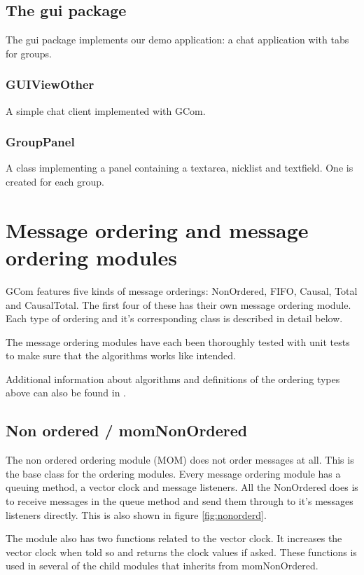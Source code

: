 \documentclass[english]{article}
\begin{document}
\subsection{The gui package}
The gui package implements our demo application: a chat application with tabs for groups. 

\subsubsection{GUIViewOther}
A simple chat client implemented with GCom.

\subsubsection{GroupPanel}
A class implementing a panel containing a textarea, nicklist and textfield. One is created for each group.


\section{Message ordering and message ordering modules}
\label{messageordering}
GCom features five kinds of message orderings: NonOrdered, FIFO, Causal, Total and CausalTotal. The first four of these has their own message ordering module. Each type of ordering and it's corresponding class is described in detail below.

The message ordering modules have each been thoroughly tested with unit tests to make sure that the algorithms works like intended.

Additional information about algorithms and definitions of the ordering types above can also be found in \cite{distsys-ordering}.

\subsection{Non ordered / momNonOrdered}
The non ordered ordering module (MOM) does not order messages at all. This is the base class for the ordering modules. Every message ordering module has a queuing method, a vector clock and message listeners. All the NonOrdered does is to receive messages in the queue method and send them through to it's messages listeners directly. This is also shown in figure \vref{fig:nonorderd}.

The module also has two functions related to the vector clock. It increases the vector clock when told so and returns the clock values if asked. These functions is used in several of the child modules that inherits from momNonOrdered.
\end{document}
